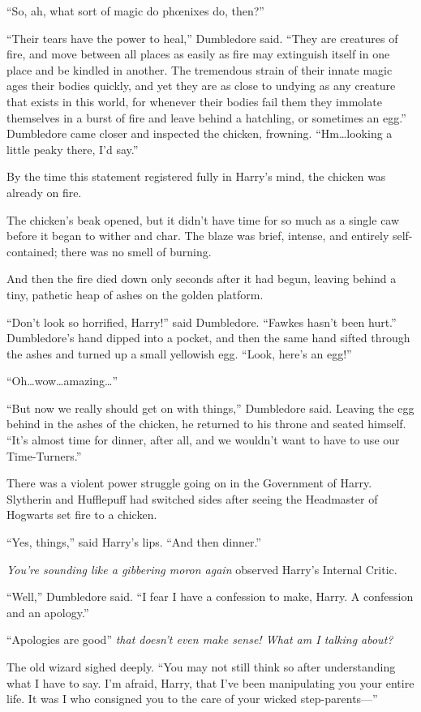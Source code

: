 “So, ah, what sort of magic do phœnixes do, then?”

“Their tears have the power to heal,” Dumbledore said. “They are creatures of fire, and move between all places as easily as fire may extinguish itself in one place and be kindled in another. The tremendous strain of their innate magic ages their bodies quickly, and yet they are as close to undying as any creature that exists in this world, for whenever their bodies fail them they immolate themselves in a burst of fire and leave behind a hatchling, or sometimes an egg.” Dumbledore came closer and inspected the chicken, frowning. “Hm…looking a little peaky there, I’d say.”

By the time this statement registered fully in Harry’s mind, the chicken was already on fire.

The chicken’s beak opened, but it didn’t have time for so much as a single caw before it began to wither and char. The blaze was brief, intense, and entirely self-contained; there was no smell of burning.

And then the fire died down only seconds after it had begun, leaving behind a tiny, pathetic heap of ashes on the golden platform.

“Don’t look so horrified, Harry!” said Dumbledore. “Fawkes hasn’t been hurt.” Dumbledore’s hand dipped into a pocket, and then the same hand sifted through the ashes and turned up a small yellowish egg. “Look, here’s an egg!”

“Oh…wow…amazing…”

“But now we really should get on with things,” Dumbledore said. Leaving the egg behind in the ashes of the chicken, he returned to his throne and seated himself. “It’s almost time for dinner, after all, and we wouldn’t want to have to use our Time-Turners.”

There was a violent power struggle going on in the Government of Harry. Slytherin and Hufflepuff had switched sides after seeing the Headmaster of Hogwarts set fire to a chicken.

“Yes, things,” said Harry’s lips. “And then dinner.”

\emph{You’re sounding like a gibbering moron again} observed Harry’s Internal Critic.

“Well,” Dumbledore said. “I fear I have a confession to make, Harry. A confession and an apology.”

“Apologies are good” \emph{that doesn’t even make sense! What am I talking about?}

The old wizard sighed deeply. “You may not still think so after understanding what I have to say. I’m afraid, Harry, that I’ve been manipulating you your entire life. It was I who consigned you to the care of your wicked step-parents—”

